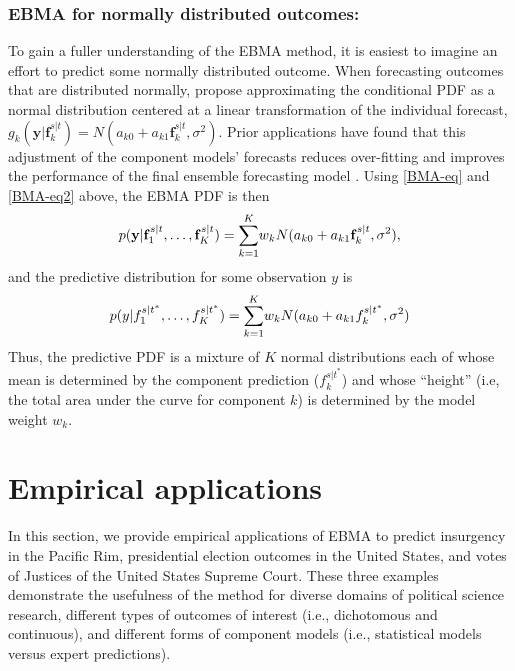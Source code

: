 \subsubsection{EBMA for normally distributed outcomes:}
To gain a fuller understanding of the EBMA method, it is easiest to
imagine an effort to predict some normally distributed outcome.  When
forecasting outcomes that are distributed normally,
\citet{Raftery:2005} propose approximating the conditional PDF as a
normal distribution centered at a linear transformation of the
individual forecast, $g_k(\mathbf{y}|\mathbf{f}_k^{s|t}) = N(a_{k0} +
a_{k1}\mathbf{f}_k^{s|t}, \sigma^2)$.  Prior applications have found
that this adjustment of the component models' forecasts reduces
over-fitting and improves the performance of the final ensemble
forecasting model \citep{Raftery:2005}.  Using
\eqref{BMA-eq} and \eqref{BMA-eq2} above, the EBMA PDF is then
\begin{equation} \small
p(\mathbf{y}|\mathbf{f}_1^{s|t}, \ldots, \mathbf{f}_K^{s|t}) = \overset{K}{\underset{k=1}{\sum}} w_k N(a_{k0} +
a_{k1}\mathbf{f}_k^{s|t}, \sigma^2),
\end{equation}
\noindent and the predictive distribution for some observation $y$ is 
\begin{equation} \small
p(y|f_1^{s|t^\ast}, \ldots, f_K^{s|t^\ast}) = \overset{K}{\underset{k=1}{\sum}} w_k N(a_{k0} +
a_{k1}f_k^{s|t^\ast}, \sigma^2)
 \end{equation}
 \noindent Thus, the predictive PDF is a mixture of $K$ normal
 distributions each of whose mean is determined by the component
 prediction ($f_k^{s|t^\ast}$) and whose ``height'' (i.e, the total
 area under the curve for component $k$) is determined by the model
 weight $w_k$.




\section{Empirical applications}

In this section, we provide empirical applications of EBMA to predict
insurgency in the Pacific Rim, presidential election outcomes in the
United States, and votes of Justices of the United States Supreme
Court.  These three examples demonstrate the usefulness of the method
for diverse domains of political science research, different types of
outcomes of interest (i.e., dichotomous and continuous), and different
forms of component models (i.e., statistical models versus expert
predictions).



